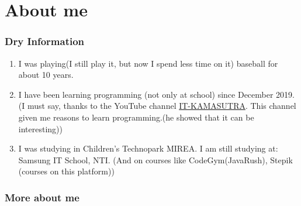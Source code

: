 \documentclass[a4paper, 12pt]{article}
\begin{document}
	\part{About me}
	\section*{Dry Information}
	\begin{enumerate}
		\item I was playing(I still play it, but now I spend less time on it) baseball for about 10 years.
		\item I have been learning programming (not only at school) since December 2019.(I must say, thanks to the YouTube channel \href{https://www.youtube.com/channel/UCTW0FUhT0m-Bqg2trTbSs0g}{IT-KAMASUTRA}. This channel given me reasons to learn programming.(he showed that it can be interesting))
		\item I was studying in Children's Technopark MIREA. I am still studying at: Samsung IT School, NTI. (And on courses like CodeGym(JavaRush), Stepik (courses on this platform))
	\end{enumerate}

	\section*{More about me}
	
\end{document}
